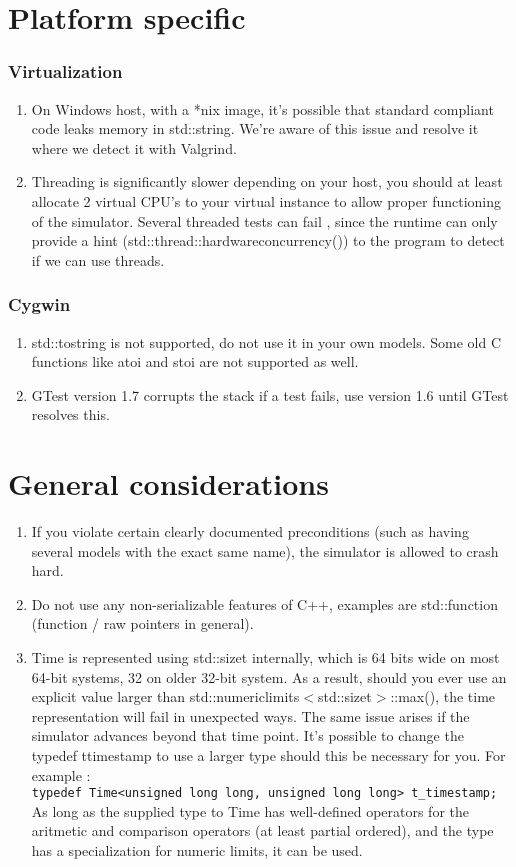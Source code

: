 
\section{Platform specific}
\subsubsection{Virtualization}
\begin{enumerate}
\item On Windows host, with a *nix image, it's possible that standard compliant code leaks memory in std::string. We're aware of this issue and resolve it where we detect it with Valgrind.
\item Threading is significantly slower depending on your host, you should at least allocate 2 virtual CPU's to your virtual instance to allow proper functioning of the simulator. Several threaded tests can fail , since the runtime can only provide a hint (std::thread::hardware\textunderscore concurrency()) to the program to detect if we can use threads.
\end{enumerate}
\subsubsection{Cygwin}
\begin{enumerate}
\item std::to\textunderscore string is not supported, do not use it in your own models. Some old C functions like atoi and stoi are not supported as well.
\item GTest version 1.7 corrupts the stack if a test fails, use version 1.6 until GTest resolves this.
\end{enumerate}
\section{General considerations}
\begin{enumerate}
\item If you violate certain clearly documented preconditions (such as having several models with the exact same name), the simulator is allowed to crash hard.
\item Do not use any non-serializable features of C++, examples are std::function (function / raw pointers in general).
\item Time is represented using std::size\textunderscore t internally, which is 64 bits wide on most 64-bit systems, 32 on older 32-bit system. As a result, should you ever use an explicit value larger than std::numeric\textunderscore limits$<$std::size\textunderscore t$>$::max(), the time representation will fail in unexpected ways. The same issue arises if the simulator advances beyond that time point. It's possible to change the typedef t\textunderscore timestamp to use a larger type should this be necessary for you. For example :\\
\lstinline!typedef Time<unsigned long long, unsigned long long> t_timestamp;!
As long as the supplied type to Time has well-defined operators for the aritmetic and comparison operators (at least partial ordered), and the type has a specialization for numeric limits, it can be used.
\end{enumerate}
